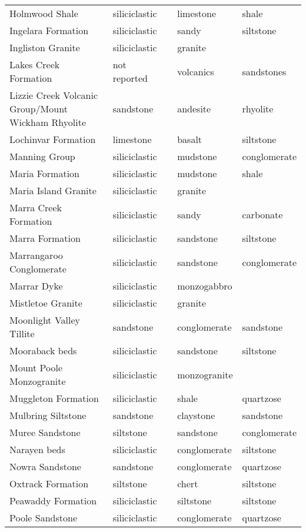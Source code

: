 \begin{table}[ht]
\begin{tabular}{lllll}
  Holmwood Shale & siliciclastic &  & limestone & shale \\ 
  Ingelara Formation & siliciclastic &  & sandy & siltstone \\ 
  Ingliston Granite & siliciclastic &  & granite &  \\ 
  Lakes Creek Formation & not reported &  & volcanics & sandstones \\ 
  Lizzie Creek Volcanic Group/Mount Wickham Rhyolite & sandstone &  & andesite & rhyolite \\ 
  Lochinvar Formation & limestone &  & basalt & siltstone \\ 
  Manning Group & siliciclastic &  & mudstone & conglomerate \\ 
  Maria Formation & siliciclastic &  & mudstone & shale \\ 
  Maria Island Granite & siliciclastic &  & granite &  \\ 
  Marra Creek Formation & siliciclastic &  & sandy & carbonate \\ 
  Marra Formation & siliciclastic &  & sandstone & siltstone \\ 
  Marrangaroo Conglomerate & siliciclastic &  & sandstone & conglomerate \\ 
  Marrar Dyke & siliciclastic &  & monzogabbro &  \\ 
  Mistletoe Granite & siliciclastic &  & granite &  \\ 
  Moonlight Valley Tillite & sandstone &  & conglomerate & sandstone \\ 
  Mooraback beds & siliciclastic &  & sandstone & siltstone \\ 
  Mount Poole Monzogranite & siliciclastic &  & monzogranite &  \\ 
  Muggleton Formation & siliciclastic &  & shale & quartzose \\ 
  Mulbring Siltstone & sandstone &  & claystone & sandstone \\ 
  Muree Sandstone & siltstone &  & sandstone & conglomerate \\ 
  Narayen beds & siliciclastic &  & conglomerate & siltstone \\ 
  Nowra Sandstone & sandstone &  & conglomerate & quartzose \\ 
  Oxtrack Formation & siltstone &  & chert & siltstone \\ 
  Peawaddy Formation & siliciclastic &  & siltstone & siltstone \\ 
  Poole Sandstone & siliciclastic &  & conglomerate & quartzose \\ 

\end{tabular}
\end{table}
